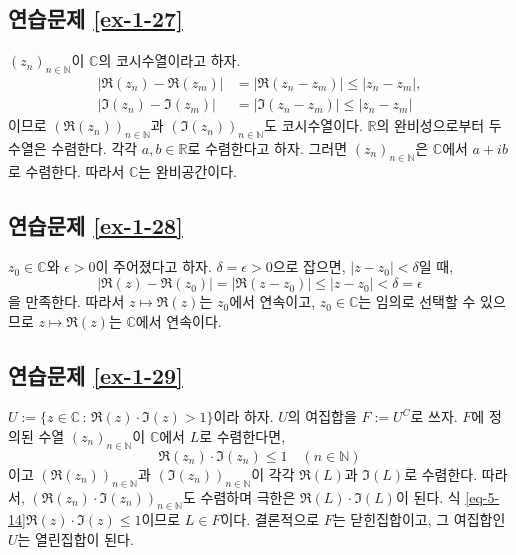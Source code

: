 \subsection*{연습문제 \ref{ex-1-27}}

$(z_n)_{n\in\mathbb N}$이 $\mathbb C$의 코시수열이라고 하자.
\begin{align*}
|\Re(z_n) - \Re(z_m)| &= |\Re(z_n-z_m)| \le |z_n - z_m|, \\
|\Im(z_n) - \Im(z_m)| &= |\Im(z_n-z_m)| \le |z_n - z_m|
\end{align*}
이므로  $(\Re(z_n))_{n\in\mathbb N}$과 
$(\Im(z_n))_{n\in\mathbb N}$도 코시수열이다.
$\mathbb R$의 완비성으로부터 두 수열은 수렴한다.
각각 $a,b\in\mathbb R$로 수렴한다고 하자.
그러면 $(z_n)_{n\in\mathbb N}$은 $\mathbb C$에서 $a+ib$로 수렴한다.
따라서 $\mathbb C$는 완비공간이다.

\subsection*{연습문제 \ref{ex-1-28}}

$z_0\in\mathbb C$와 $\epsilon >0$이 주어졌다고 하자.
$\delta = \epsilon>0$으로 잡으면,
$|z-z_0|< \delta$일 때,
\[
|\Re(z) - \Re(z_0)| = |\Re(z-z_0)| \le |z-z_0| < \delta = \epsilon
\]
을 만족한다.
따라서 $z \mapsto \Re(z)$는 $z_0$에서 연속이고,
$z_0\in\mathbb C$는 임의로 선택할 수 있으므로
$z \mapsto \Re(z)$는 $\mathbb C$에서 연속이다.

\subsection*{연습문제 \ref{ex-1-29}}

$U:= \{ z\in\mathbb C\,:\, \Re(z)\cdot \Im(z) >1 \}$이라 하자.
$U$의 여집합을 $F:=U^C$로 쓰자.
$F$에 정의된 수열 $(z_n)_{n\in\mathbb N}$이 $\mathbb C$에서 $L$로 수렴한다면,
\begin{equation} \label{eq-5-14}
\Re(z_n)\cdot \Im(z_n) \le 1
\quad (n\in \mathbb N)
\end{equation}
이고 $(\Re(z_n))_{n\in\mathbb N}$과 
$(\Im(z_n))_{n\in\mathbb N}$이 각각 $\Re(L)$과 $\Im(L)$로 수렴한다.
따라서,  $(\Re(z_n)\cdot \Im(z_n))_{n\in\mathbb N}$도 수렴하며
극한은 $\Re(L)\cdot \Im(L)$이 된다.
식 \eqref{eq-5-14} $\Re(z)\cdot \Im(z) \le 1$이므로
$L\in F$이다.
결론적으로 $F$는 닫힌집합이고, 그 여집합인 $U$는 열린집합이 된다.

